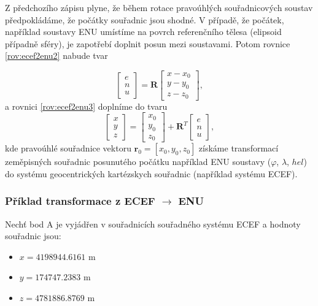 \documentclass[11pt,a4paper]{article}
\begin{document}
Z předchozího zápisu plyne, že během rotace pravoúhlých souřadnicových soustav předpokládáme, že počátky souřadnic jsou shodné. V případě, že počátek, například soustavy ENU umístíme na povrch referenčního tělesa (elipsoid případně sféry), je zapotřebí doplnit posun mezi soustavami. Potom rovnice \ref{rov:ecef2enu2} nabude tvar

\begin{equation}
\begin{bmatrix}
e \\
n \\
u
\end{bmatrix} =
\mathbf{R}
\begin{bmatrix}
x - x_{0} \\
y - y_{0} \\
z - z_{0}
\end{bmatrix},
\label{rov:ecef2enu22}
\end{equation}
a rovnici \ref{rov:ecef2enu3} doplníme do tvaru
\begin{equation}
\begin{bmatrix}
x \\
y \\
z
\end{bmatrix} =
\begin{bmatrix}
x_{0} \\
y_{0} \\
z_{0}
\end{bmatrix} + 
\mathbf{R}^{T}
\begin{bmatrix}
e \\
n \\
u
\end{bmatrix},
\label{rov:ecef2enu33}
\end{equation}
kde pravoúhlé souřadnice vektoru $\mathbf{r}_{0}=\left[x_{0}, y_{0}, z_{0} \right]$ získáme transformací zeměpisných souřadnic posunutého počátku například ENU soustavy ($\varphi$, $\lambda$, $hel$) do systému geocentrických kartézskych souřadnic (například systému ECEF).

\subsubsection{Příklad transformace z ECEF $\rightarrow$ ENU}

Nechť bod A je vyjádřen v souřadnicích souřadného systému ECEF a hodnoty souřadnic jsou:
\begin{itemize}
\item $x = 4198944.6161$ m
\item $y = 174747.2383$ m
\item $z = 4781886.8769$ m
\end{itemize}
\end{document}
